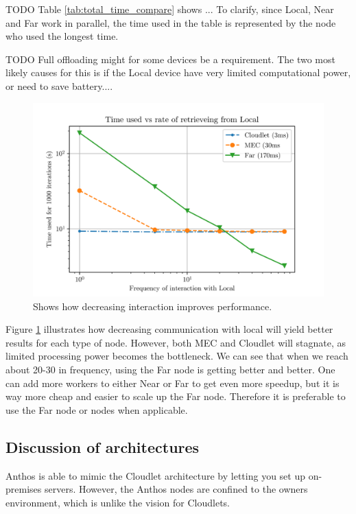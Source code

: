 TODO Table \ref{tab:total_time_compare} shows ... To clarify, since Local, Near and Far work in parallel, the time used in the table is represented by the node who used the longest time. 

TODO Full offloading might for some devices be a requirement. The two most likely causes for this is if the Local device have very limited computational power, or need to save battery....


\begin{figure}
    \centering
    \includegraphics{chapters/evaluation/figures/All_latency.png}
    \caption{Shows how decreasing interaction improves performance.}
    \label{fig:all_graph_decrease}
\end{figure}

Figure \ref{fig:all_graph_decrease} illustrates how decreasing communication with local will yield better results for each type of node. However, both MEC and Cloudlet will stagnate, as limited processing power becomes the bottleneck. We can see that when we reach about 20-30 in frequency, using the Far node is getting better and better. One can add more workers to either Near or Far to get even more speedup, but it is way more cheap and easier to scale up the Far node. Therefore it is preferable to use the Far node or nodes when applicable.





\subsection{Discussion of architectures}
Anthos is able to mimic the Cloudlet architecture by letting you set up on-premises servers. However, the Anthos nodes are confined to the owners environment, which is unlike the vision for Cloudlets. 

